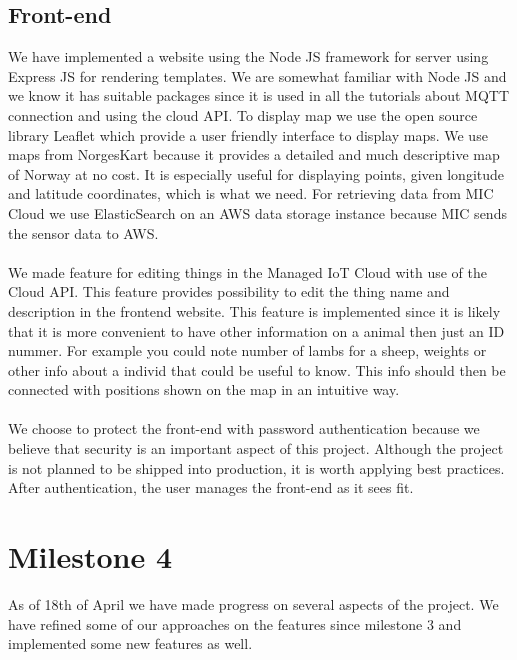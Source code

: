 		
	\subsection{Front-end}
		We have implemented a website using the Node JS framework for server using Express JS for rendering templates. We are somewhat familiar with Node JS and we know it has suitable packages since it is used in all the tutorials about MQTT connection and using the cloud API.  To display map we use the open source library Leaflet which provide a user friendly interface to display maps. We use maps from NorgesKart because it provides a detailed and much descriptive map of Norway at no cost. It is especially useful for displaying points, given longitude and latitude coordinates, which is what we need. For retrieving data from MIC Cloud we use ElasticSearch on an AWS data storage instance because MIC sends the sensor data to AWS. 
		\\\\
		We made feature for editing things in the Managed IoT Cloud with use of the Cloud API. This feature provides possibility to edit the thing name and description in the frontend website. This feature is implemented since it is likely that it is more convenient to have other information on a animal then just an ID nummer. For example you could note number of lambs for a sheep, weights or other info about a individ that could be useful to know. This info should then be connected with positions shown on the map in an intuitive way. 
		\\\\
		We choose to protect the front-end with password authentication because we believe that security is an important aspect of this project. Although the project is not planned to be shipped into production, it is worth applying best practices. After authentication, the user manages the front-end as it sees fit. 
		
\section{Milestone 4}
	As of 18th of April we have made progress on several aspects of the project. We have refined some of our approaches on the features since milestone 3 and implemented some new features as well. 
